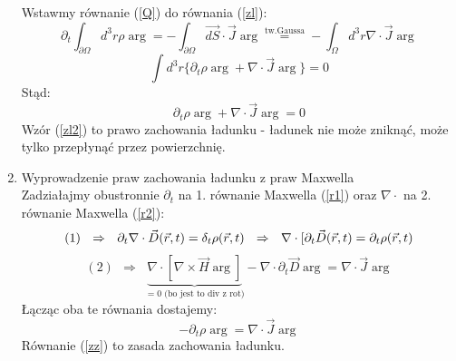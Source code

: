 \begin{enumerate}
Wstawmy równanie (\ref{Q}) do równania (\ref{zl}):
\begin{equation}
\partial_t \int_{\partial\Omega} d^3r\rho\arg= -\int_{\partial\Omega}\vec{dS}\cdot\vec{J}\arg 
\stackrel{\text{tw.Gaussa}}{=} -\int_\Omega d^3r\nabla\cdot\vec{J}\arg
\end{equation}
\begin{equation}
\int d^3r\{\partial_t \rho\arg+\nabla \cdot\vec{J}\arg\}=0
\end{equation}
Stąd:
\begin{equation}
\partial_t \rho\arg+\nabla \cdot\vec{J}\arg=0 \label{zl2} \end{equation}
Wzór (\ref{zl2}) to prawo zachowania ładunku - ładunek nie może zniknąć, może tylko przepłynąć przez powierzchnię.

\item{Wyprowadzenie praw zachowania ładunku z praw Maxwella}\\
Zadziałajmy obustronnie $\partial_t$ na 1. równanie Maxwella (\ref{r1}) oraz $\nabla\cdot$ na 2. równanie Maxwella (\ref{r2}):
\begin{equation}
(1)~~\Rightarrow ~~\partial_t \nabla\cdot \vec{D}(\vec{r},t)=\delta_t \rho(\vec{r},t) ~~\Rightarrow~~ \nabla\cdot[\partial_t\vec{D}(\vec{r},t)=\partial_t\rho(\vec{r},t) \end{equation}
 \begin{equation}
 (2)~~\Rightarrow~~ \underbrace{\nabla\cdot[\nabla\times\vec{H}\arg]}_{=0 \text{ (bo jest to div z rot)}}-\nabla\cdot\partial_t\vec{D}\arg=\nabla\cdot\vec{J}\arg
\end{equation}
Łącząc oba te równania dostajemy:
\begin{equation}
-\partial_t\rho\arg=\nabla\cdot\vec{J}\arg \label{zz}
\end{equation}
Równanie (\ref{zz}) to zasada zachowania ładunku.


\end{enumerate}
